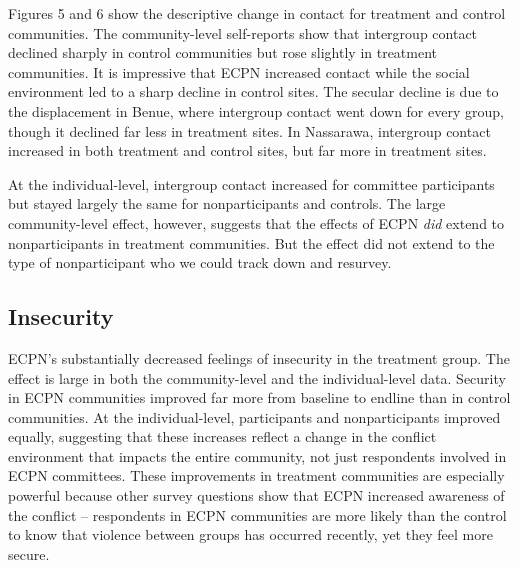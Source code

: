 \documentclass[11pt]{article}
\begin{document}
Figures 5 and 6 show the descriptive change in contact for treatment and
control communities. The community-level self-reports show that
intergroup contact declined sharply in control communities but rose
slightly in treatment communities. It is impressive that ECPN increased
contact while the social environment led to a sharp decline in control
sites. The secular decline is due to the displacement in Benue, where
intergroup contact went down for every group, though it declined far
less in treatment sites. In Nassarawa, intergroup contact increased in
both treatment and control sites, but far more in treatment sites.

At the individual-level, intergroup contact increased for committee
participants but stayed largely the same for nonparticipants and
controls. The large community-level effect, however, suggests that the
effects of ECPN \emph{did} extend to nonparticipants in treatment
communities. But the effect did not extend to the type of nonparticipant
who we could track down and resurvey.

\hypertarget{insecurity}{%
\subsection{Insecurity}\label{insecurity}}

ECPN's substantially decreased feelings of insecurity in the treatment
group. The effect is large in both the community-level and the
individual-level data. Security in ECPN communities improved far more
from baseline to endline than in control communities. At the
individual-level, participants and nonparticipants improved equally,
suggesting that these increases reflect a change in the conflict
environment that impacts the entire community, not just respondents
involved in ECPN committees. These improvements in treatment communities
are especially powerful because other survey questions show that ECPN
increased awareness of the conflict -- respondents in ECPN communities
are more likely than the control to know that violence between groups
has occurred recently, yet they feel more secure.
\end{document}
